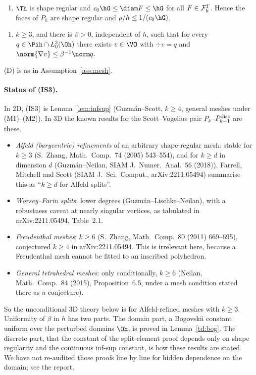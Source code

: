 \begin{assumption}\label{td:ass}\leavevmode
\begin{enumerate}[label=(M0$^3$)]
\item $\Th$ is shape regular and $c_0\hG\le\diam F\le\hG$ for all $F\in\mathcal F_h^\Gamma$. Hence the faces of $P_h$ are shape regular and $\rho/h\le1/(c_0\hG)$.
\end{enumerate}
\begin{enumerate}[label=(IS3)]
\item $k\ge3$, and there is $\beta>0$, independent of $h$, such that for every $q\in\Pih\cap L^2_0(\Oh)$ there exists $v\in\VO$ with $\div v=q$ and $\norm{\nabla v}\le\beta^{-1}\norm q$.
\end{enumerate}
(D) is as in Assumption~\ref{ass:mesh}.
\end{assumption}

\paragraph{Status of (IS3).} In 2D, (IS3) is Lemma~\ref{lem:infsup} (Guzm\'an--Scott, $k\ge4$, general meshes under (M1)--(M2)). In 3D the known results for the Scott--Vogelius pair $P_k$--$P_{k-1}^{\rm disc}$ are these.
\begin{itemize}
\item \emph{Alfeld (barycentric) refinements} of an arbitrary shape-regular mesh: stable for $k\ge3$ (S.~Zhang, Math.\ Comp.\ 74 (2005) 543--554), and for $k\ge d$ in dimension $d$ (Guzm\'an--Neilan, SIAM J.\ Numer.\ Anal.\ 56 (2018)). Farrell, Mitchell and Scott (SIAM J.\ Sci.\ Comput., arXiv:2211.05494) summarise this as ``$k\ge d$ for Alfeld splits''.
\item \emph{Worsey--Farin splits}: lower degrees (Guzm\'an--Lischke--Neilan), with a robustness caveat at nearly singular vertices, as tabulated in arXiv:2211.05494, Table~2.1.
\item \emph{Freudenthal meshes}: $k\ge6$ (S.~Zhang, Math.\ Comp.\ 80 (2011) 669--695), conjectured $k\ge4$ in arXiv:2211.05494. This is irrelevant here, because a Freudenthal mesh cannot be fitted to an inscribed polyhedron.
\item \emph{General tetrahedral meshes}: only conditionally, $k\ge6$ (Neilan, Math.\ Comp.\ 84 (2015), Proposition~6.5, under a mesh condition stated there as a conjecture).
\end{itemize}
So the unconditional 3D theory below is for Alfeld-refined meshes with $k\ge3$. Uniformity of $\beta$ in $h$ has two parts. The domain part, a Bogovskii constant uniform over the perturbed domains $\Oh$, is proved in Lemma~\ref{td:bog}. The discrete part, that the constant of the split-element proof depends only on shape regularity and the continuous inf-sup constant, is how these results are stated. We have not re-audited those proofs line by line for hidden dependence on the domain; see the report.

